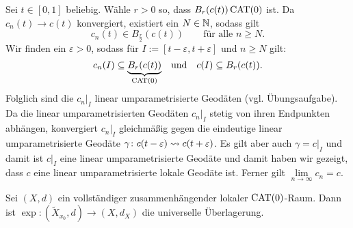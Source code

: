 \begin{beweis}
\begin{enumerate}[(i)]
		Sei $t \in [0,1]$ beliebig.
		Wähle  $r > 0$ so, dass $B_r(c(t)) \operatorname{CAT(0)}$ ist.
		Da $c_n(t) \rightarrow c(t)$ konvergiert, existiert ein $N \in \mathbb{N}$, sodass gilt
		\[
			c_n(t) \in B_{\frac{r}{2}}(c(t)) \qquad \text{für alle } n \geq N.
		\]
		Wir finden ein $\varepsilon > 0$, sodass für $I := [t- \varepsilon, t+ \varepsilon]$ und $n \geq N$ gilt:
		\[
			c_n(I) \subseteq {\underbrace{B_r(c(t))}_{\operatorname{CAT(0)}}} \quad \text{und} \quad c(I) \subseteq B_r(c(t)).
		\]
		Folglich sind die $c_n \big|_I$ linear umparametrisierte Geodäten (vgl. Übungsaufgabe).
		Da die linear umparametrisierten Geodäten $c_n \big|_I$ stetig von ihren Endpunkten abhängen, konvergiert $c_n \big|_I$ gleichmäßig gegen die eindeutige linear umparametrisierte Geodäte $\gamma \colon c(t-\varepsilon) \rightsquigarrow c(t+\varepsilon)$.
		Es gilt aber auch $\gamma = c \big|_I$ und damit ist $c \big|_I$ eine linear umparametrisierte Geodäte und damit haben wir gezeigt, dass $c$ eine linear umparametrisierte lokale Geodäte ist.
		Ferner gilt $\lim\limits_{n \rightarrow \infty} c_n = c$. \qedhere
	\end{enumerate}
\end{beweis}	

\begin{satz}
\label{satz:2.33}
	Sei $(X,d)$ ein vollständiger zusammenhängender lokaler $\operatorname{CAT(0)}$-Raum. 
	Dann ist $\exp\colon (\tilde{X}_{x_0},d) \rightarrow (X,d_X)$ die universelle Überlagerung.
\end{satz}

